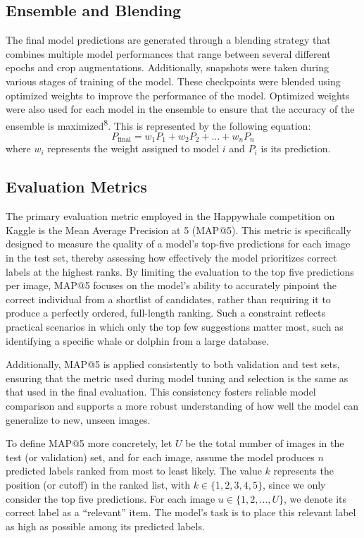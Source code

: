 \documentclass[twocolumn]{article}
\begin{document}
\subsection{Ensemble and Blending}

The final model predictions are generated through a blending strategy that combines multiple model performances that range between several different epochs and crop augmentations. Additionally, snapshots were taken during various stages of training of the model. These checkpoints were blended using optimized weights to improve the performance of the model. Optimized weights were also used for each model in the ensemble to ensure that the accuracy of the ensemble is maximized\textsuperscript{8}. This is represented by the following equation:
\[
P_{\text{final}} = w_1 P_1 + w_2 P_2 + \dots + w_n P_n
\]
 where $w_i$ represents the weight assigned to model $i$ and $P_i$ is its prediction.

\subsection{Evaluation Metrics}

The primary evaluation metric employed in the Happywhale competition on Kaggle is the Mean Average Precision at 5 (MAP@5). This metric is specifically designed to measure the quality of a model’s top-five predictions for each image in the test set, thereby assessing how effectively the model prioritizes correct labels at the highest ranks. By limiting the evaluation to the top five predictions per image, MAP@5 focuses on the model’s ability to accurately pinpoint the correct individual from a shortlist of candidates, rather than requiring it to produce a perfectly ordered, full-length ranking. Such a constraint reflects practical scenarios in which only the top few suggestions matter most, such as identifying a specific whale or dolphin from a large database. 

Additionally, MAP@5 is applied consistently to both validation and test sets, ensuring that the metric used during model tuning and selection is the same as that used in the final evaluation. This consistency fosters reliable model comparison and supports a more robust understanding of how well the model can generalize to new, unseen images.

To define MAP@5 more concretely, let \( U \) be the total number of images in the test (or validation) set, and for each image, assume the model produces \( n \) predicted labels ranked from most to least likely. The value \( k \) represents the position (or cutoff) in the ranked list, with \( k \in \{1, 2, 3, 4, 5\} \), since we only consider the top five predictions. For each image \( u \in \{1, 2, \ldots, U\} \), we denote its correct label as a “relevant” item. The model’s task is to place this relevant label as high as possible among its predicted labels. 
\end{document}

